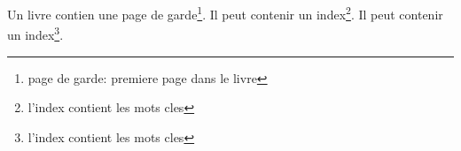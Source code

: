 \documentclass{article}
\begin{document}
	Un livre contien une page de garde\footnote{page de garde: premiere page dans le livre}. 
	Il peut contenir un index\footnote{l'index contient les mots cles}. 
	\newpage
	Il peut contenir un index\footnote{l'index contient les mots cles}. 
\end{document}
